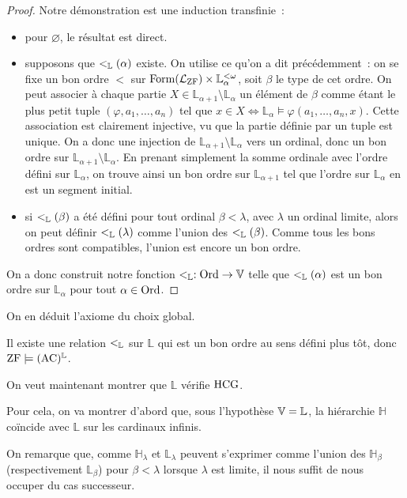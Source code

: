 \begin{proof}
  Notre démonstration est une induction transfinie~:
  \begin{itemize}
  \item pour $\varnothing$, le résultat est direct.
  \item supposons que $<_{\mathbb L}(\alpha)$ existe. On utilise ce qu'on a dit
    précédemment~: on se fixe un bon ordre $<$ sur
    $\operatorname{Form}(\mathcal L_{\operatorname{ZF}})\times \mathbb L_{\alpha}^{<\omega}$, soit
    $\beta$ le type de cet ordre. On peut associer à chaque partie
    $X\in\mathbb L_{\alpha + 1}\setminus\mathbb L_\alpha$ un élément de $\beta$
    comme étant le plus petit tuple $(\varphi,a_1,\ldots,a_n)$ tel que
    $x\in X \iff \mathbb L_{\alpha}\models \varphi(a_1,\ldots,a_n,x)$.
    Cette association est clairement injective, vu que la partie définie par
    un tuple est unique. On a donc une injection de
    $\mathbb L_{\alpha + 1}\setminus \mathbb L_\alpha$ vers un ordinal, donc un
    bon ordre sur $\mathbb L_{\alpha + 1} \setminus \mathbb L_\alpha$.
    En prenant simplement la somme ordinale avec l'ordre défini sur
    $\mathbb L_\alpha$, on trouve ainsi un bon ordre sur
    $\mathbb L_{\alpha + 1}$ tel que l'ordre sur $\mathbb L_\alpha$ en est
    un segment initial.
  \item si $<_{\mathbb L}(\beta)$ a été défini pour tout ordinal $\beta < \lambda$,
    avec $\lambda$ un ordinal limite, alors on peut définir $<_{\mathbb L}(\lambda)$
    comme l'union des $<_{\mathbb L}(\beta)$. Comme tous les bons ordres sont
    compatibles, l'union est encore un bon ordre.
  \end{itemize}
  On a donc construit notre fonction $<_{\mathbb L} : \operatorname{Ord} \to \mathbb V$ telle que
  $<_{\mathbb L}(\alpha)$ est un bon ordre sur $\mathbb L_\alpha$ pour tout
  $\alpha\in\operatorname{Ord}$.
\end{proof}

On en déduit l'axiome du choix global.

\begin{corollary}
  Il existe une relation $<_{\mathbb L}$ sur $\mathbb L$ qui est un bon ordre au sens
  défini plus tôt, donc $\operatorname{ZF}\models (\operatorname{AC})^{\mathbb L}$.
\end{corollary}

On veut maintenant montrer que $\mathbb L$ vérifie $\operatorname{HCG}$.

Pour cela, on va montrer d'abord que, sous l'hypothèse $\mathbb V = \mathbb L$, la hiérarchie
$\mathbb H$ coïncide avec $\mathbb L$ sur les cardinaux infinis.

On remarque que, comme $\mathbb H_\lambda$ et $\mathbb L_\lambda$ peuvent
s'exprimer comme l'union des $\mathbb H_\beta$ (respectivement $\mathbb L_\beta$)
pour $\beta < \lambda$ lorsque $\lambda$ est limite, il nous suffit de nous
occuper du cas successeur.


